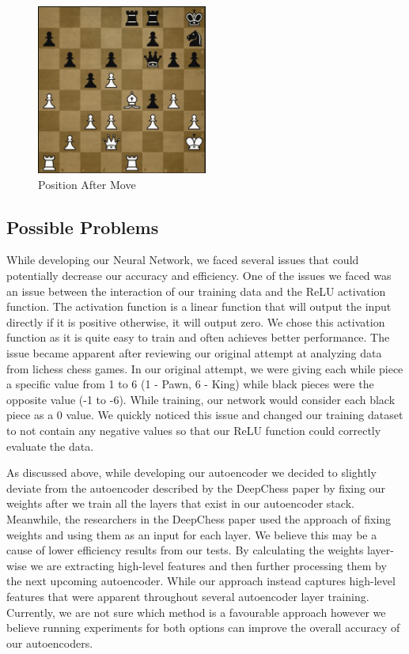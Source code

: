 \documentclass[12pt]{article}
\begin{document}
    \begin{singlespace}
        \begin{figure}[ht]
            \centering
            \caption{Position After Move}
            \label{fig:kasp_after}
            \includegraphics[width=0.5\textwidth]{kasp_pos_after.jpg}
        \end{figure}
    \end{singlespace}

    \subsection{Possible Problems}

    While developing our Neural Network, we faced several issues that could potentially decrease our accuracy and efficiency. One of the issues we faced was an issue between the interaction of our training data and the ReLU activation function. The activation function is a linear function that will output the input directly if it is positive otherwise, it will output zero. We chose this activation function as it is quite easy to train and often achieves better performance. The issue became apparent after reviewing our original attempt at analyzing data from lichess chess games. In our original attempt, we were giving each while piece a specific value from 1 to 6 (1 - Pawn, 6 - King) while black pieces were the opposite value (-1 to -6). While training, our network would consider each black piece as a 0 value. We quickly noticed this issue and changed our training dataset to not contain any negative values so that our ReLU function could correctly evaluate the data. 

    As discussed above, while developing our autoencoder we decided to slightly deviate from the autoencoder described by the DeepChess paper by fixing our weights after we train all the layers that exist in our autoencoder stack. Meanwhile, the researchers in the DeepChess paper used the approach of fixing weights and using them as an input for each layer. We believe this may be a cause of lower efficiency results from our tests. By calculating the weights layer-wise we are extracting high-level features and then further processing them by the next upcoming autoencoder. While our approach instead captures high-level features that were apparent throughout several autoencoder layer training. Currently, we are not sure which method is a favourable approach however we believe running experiments for both options can improve the overall accuracy of our autoencoders. 
\end{document}
